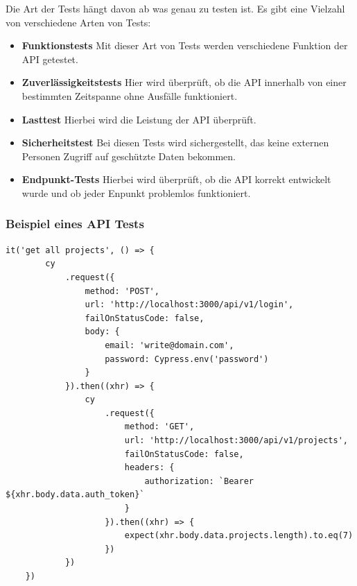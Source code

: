Die Art der Tests hängt davon ab was genau zu testen ist. Es gibt eine Vielzahl von verschiedene Arten von Tests:

\begin{itemize}
    \item \textbf{Funktionstests}
        \newline
        Mit dieser Art von Tests werden verschiedene Funktion der API getestet.
    \item \textbf{Zuverlässigkeitstests}
        \newline
        Hier wird überprüft, ob die API innerhalb von einer bestimmten Zeitspanne ohne Ausfälle funktioniert.
    \item \textbf{Lasttest}
        \newline
        Hierbei wird die Leistung der API überprüft. 
    \item \textbf{Sicherheitstest}
        \newline
        Bei diesen Tests wird sichergestellt, das keine externen Personen Zugriff auf geschützte Daten bekommen.
    \item \textbf{Endpunkt-Tests}
        \newline
        Hierbei wird überprüft, ob die API korrekt entwickelt wurde und ob jeder Enpunkt problemlos funktioniert.
\end{itemize}

\subsubsection{Beispiel eines API Tests}
\begin{lstlisting}
it('get all projects', () => {
        cy
            .request({
                method: 'POST',
                url: 'http://localhost:3000/api/v1/login',
                failOnStatusCode: false,
                body: {
                    email: 'write@domain.com',
                    password: Cypress.env('password')
                }
            }).then((xhr) => {
                cy
                    .request({
                        method: 'GET',
                        url: 'http://localhost:3000/api/v1/projects',
                        failOnStatusCode: false,
                        headers: {
                            authorization: `Bearer ${xhr.body.data.auth_token}`
                        }
                    }).then((xhr) => {
                        expect(xhr.body.data.projects.length).to.eq(7)
                    })
            })
    })
\end{lstlisting}

